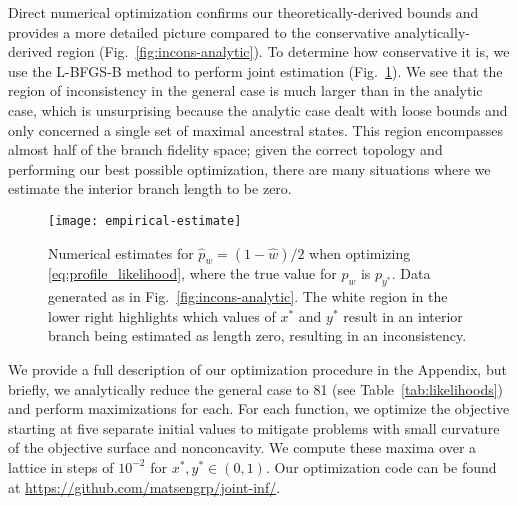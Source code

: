 \documentclass[11pt]{article}
\begin{document}
Direct numerical optimization confirms our theoretically-derived bounds and provides a more detailed picture compared to the conservative analytically\hyp{}derived region (Fig.~\ref{fig:incons-analytic}).
To determine how conservative it is, we use the L-BFGS-B method to perform joint estimation (Fig.~\ref{fig:bl-general-inconsistency}).
We see that the region of inconsistency in the general case is much larger than in the analytic case, which is unsurprising because the analytic case dealt with loose bounds and only concerned a single set of maximal ancestral states.
This region encompasses almost half of the branch fidelity space; given the correct topology and performing our best possible optimization, there are many situations where we estimate the interior branch length to be zero.

\begin{figure}
\centering
\texttt{[image: empirical-estimate]}
\caption{
    Numerical estimates for $\hat{p}_w=(1-\hat{w})/2$ when optimizing \eqref{eq:profile_likelihood}, where the true value for $p_w$ is $p_{y^*}$.
    Data generated as in Fig.~\ref{fig:incons-analytic}.
    The white region in the lower right highlights which values of $x^*$ and $y^*$ result in an interior branch being estimated as length zero, resulting in an inconsistency.
}
\label{fig:bl-general-inconsistency}
\end{figure}

We provide a full description of our optimization procedure in the Appendix, but briefly, we analytically reduce the general case to 81 (see Table~\ref{tab:likelihoods}) and perform maximizations for each.
For each function, we optimize the objective starting at five separate initial values to mitigate problems with small curvature of the objective surface and nonconcavity.
We compute these maxima over a lattice in steps of $10^{-2}$ for $x^*,y^*\in(0,1)$.
Our optimization code can be found at \url{https://github.com/matsengrp/joint-inf/}.
\end{document}
